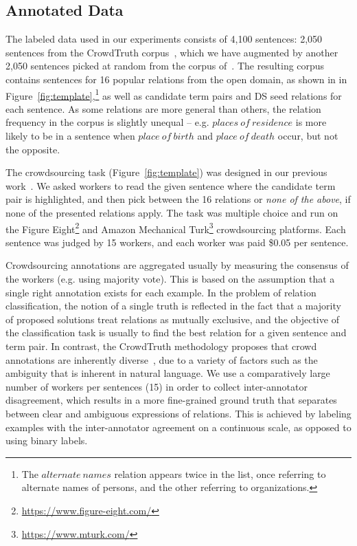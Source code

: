 
\subsection{Annotated Data}

The labeled data used in our experiments consists of 4,100 sentences: 2,050 sentences from the CrowdTruth corpus~\cite{dumitrache2017false}, which we have augmented by another 2,050 sentences picked at random from the corpus of~\citet{angeli2014combining}. The resulting corpus contains sentences for 16 popular relations from the open domain, as shown in in Figure~\ref{fig:template},\footnote{The $alternate\ names$ relation appears twice in the list, once referring to alternate names of persons, and the other referring to organizations.} as well as candidate term pairs and DS seed relations for each sentence. As some relations are more general than others, the relation frequency in the corpus is slightly unequal -- e.g. $places\ of\ residence$ is more likely to be in a sentence when $place\ of\ birth$ and $place\ of\ death$ occur, but not the opposite.

The crowdsourcing task (Figure~\ref{fig:template}) was designed in our previous work~\cite{dumitrache2017false}. We asked workers to read the given sentence where the candidate term pair is highlighted, and then pick between the 16 relations or \textit{none of the above}, if none of the presented relations apply. The task was multiple choice and run on the Figure Eight\footnote{\url{https://www.figure-eight.com/}} and Amazon Mechanical Turk\footnote{\url{https://www.mturk.com/}} crowdsourcing platforms. Each sentence was judged by 15 workers, and each worker was paid \$0.05 per sentence. 

Crowdsourcing annotations are aggregated usually by measuring the consensus of the workers (e.g. using majority vote). This is based on the assumption that a single right annotation exists for each example. In the problem of relation classification, the notion of a single truth is reflected in the fact that a majority of proposed solutions treat relations as mutually exclusive, and the objective of the classification task is usually to find the best relation for a given sentence and term pair. In contrast, the CrowdTruth methodology proposes that crowd annotations are inherently diverse~\cite{aroyo2015truth}, due to a variety of factors such as the ambiguity that is inherent in natural language. We use a comparatively large number of workers per sentences (15) in order to collect inter-annotator disagreement, which results in a more fine-grained ground truth that separates between clear and ambiguous expressions of relations. This is achieved by labeling examples with the inter-annotator agreement on a continuous scale, as opposed to using binary labels.

